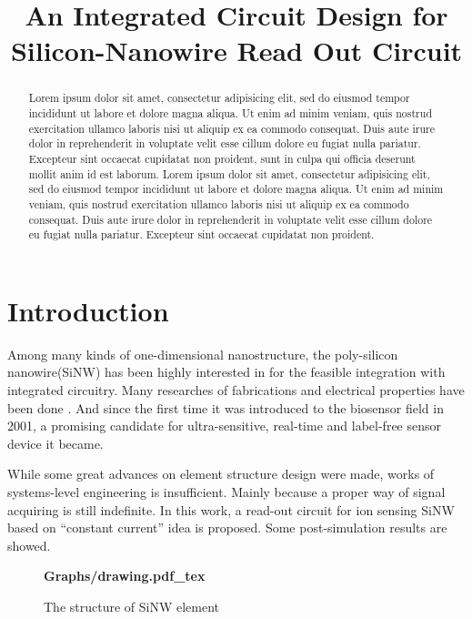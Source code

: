 \documentclass{article}
\title{An Integrated Circuit Design for Silicon-Nanowire Read Out Circuit}
\begin{document}
%
\maketitle
%
\begin{abstract}
Lorem ipsum dolor sit amet, consectetur adipisicing elit, sed do eiusmod tempor incididunt ut labore et dolore magna aliqua. Ut enim ad minim veniam, quis nostrud exercitation ullamco laboris nisi ut aliquip ex ea commodo consequat. Duis aute irure dolor in reprehenderit in voluptate velit esse cillum dolore eu fugiat nulla pariatur. Excepteur sint occaecat cupidatat non proident, sunt in culpa qui officia deserunt mollit anim id est laborum.
Lorem ipsum dolor sit amet, consectetur adipisicing elit, sed do eiusmod tempor incididunt ut labore et dolore magna aliqua. Ut enim ad minim veniam, quis nostrud exercitation ullamco laboris nisi ut aliquip ex ea commodo consequat. Duis aute irure dolor in reprehenderit in voluptate velit esse cillum dolore eu fugiat nulla pariatur. Excepteur sint occaecat cupidatat non proident.
\end{abstract}
%
\section{Introduction}
\label{sec:intro}

Among many kinds of one-dimensional nanostructure, the poly-silicon nanowire(SiNW) has been highly interested in for the feasible integration with integrated circuitry.
Many researches of fabrications and electrical properties have been done \cite{J1}.
And since the first time it was introduced to the biosensor field in 2001\cite{J2}, a promising candidate for ultra-sensitive, real-time and label-free  sensor device it became.

While some great advances on element structure design were made\cite{J3}, works of systems-level engineering is insufficient.
Mainly because a proper way of signal acquiring is still indefinite.
In this work, a read-out circuit for ion sensing SiNW based on “constant current” idea is proposed.
Some post-simulation results are showed.



\begin{figure}[b]
    \centering
    {\selectfont \textbf{
        \def\svgwidth{5.0cm}
        \fontsize{6}{7}\selectfont
         {Graphs/drawing.pdf_tex}
        \fontsize{12}{15}\selectfont
    }}
\caption{The structure of SiNW element}
\label{fig:res}
\end{figure}
\end{document}

